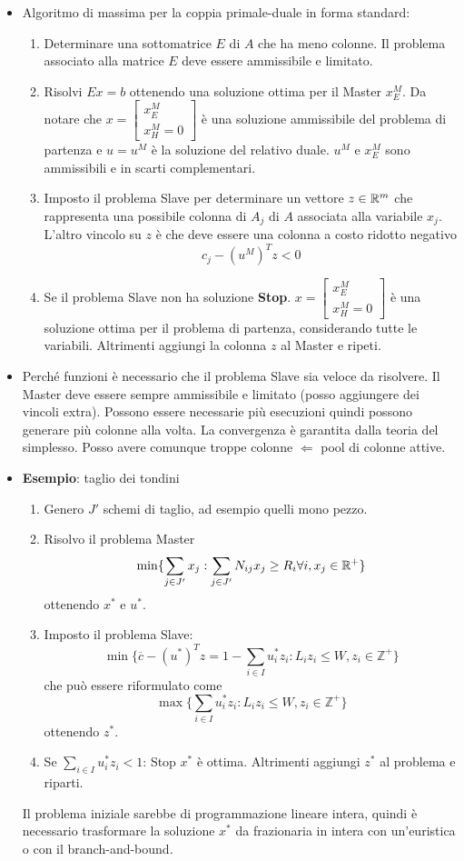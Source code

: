 \begin{itemize}
	\item Algoritmo di massima per la coppia primale-duale in forma standard:
	\begin{enumerate}
		\item Determinare una sottomatrice $E$ di $A$ che ha meno colonne. Il problema associato alla matrice $E$ deve essere ammissibile e limitato.
		\item Risolvi $Ex = b$ ottenendo una soluzione ottima per il Master $x_{E}^M$. Da notare che $x = \begin{bmatrix} x_{E}^M \\
		x_{H}^M = 0
		\end{bmatrix}$ è una soluzione ammissibile del problema di partenza e $u = u^M$ è la soluzione del relativo duale. $u^M$ e $x_{E}^M$ sono ammissibili e in scarti complementari.
		\item Imposto il problema Slave per determinare un vettore $z \in \mathbb{R}^m$ che rappresenta una possibile colonna di $A_j$ di $A$ associata alla variabile $x_j$. L'altro vincolo su $z$ è che deve essere una colonna a costo ridotto negativo
		$$
		c_j - (u^M)^T z < 0
		$$
		\item Se il problema Slave non ha soluzione \textbf{Stop}. $x = \begin{bmatrix} x_{E}^M \\
		x_{H}^M = 0
		\end{bmatrix}$ è una soluzione ottima per il problema di partenza, considerando tutte le variabili. Altrimenti aggiungi la colonna $z$ al Master e ripeti.
	\end{enumerate}
	\item Perché funzioni è necessario che il problema Slave sia veloce da risolvere. Il Master deve essere sempre ammissibile e limitato (posso aggiungere dei vincoli extra). Possono essere necessarie più esecuzioni quindi possono generare più colonne alla volta. La convergenza è garantita dalla teoria del simplesso. Posso avere comunque troppe colonne $\Leftarrow$ pool di colonne attive.
	\item \textbf{Esempio}: taglio dei tondini
	\begin{enumerate}
		\item Genero $J'$ schemi di taglio, ad esempio quelli mono pezzo.
		\item Risolvo il problema Master
		$$
		\min \{ \sum_{j \in J'} x_j : \sum_{j \in J'} N_{ij}x_j \geq R_i \forall i, x_j \in \mathbb{R}^+ \}
		$$
		ottenendo $x^*$ e $u^*$.
		\item Imposto il problema Slave:
		$$
		\min \{\overline{c} - (u^*)^Tz = 1 - \sum_{i \in I} u_{i}^*z_i : L_iz_i \leq W, z_i \in \mathbb{Z}^+ \}
		$$
		che può essere riformulato come
		$$
		\max \{\sum_{i \in I} u_{i}^*z_i : L_iz_i \leq W, z_i \in \mathbb{Z}^+ \}
		$$
		ottenendo $z^*$.
		\item Se $\sum_{i \in I} u_{i}^*z_i < 1$: Stop $x^*$ è ottima. Altrimenti aggiungi $z^*$ al problema e riparti.
	\end{enumerate} 
	Il problema iniziale sarebbe di programmazione lineare intera, quindi è necessario trasformare la soluzione $x^*$ da frazionaria in intera con un'euristica o con il branch-and-bound.
\end{itemize}


